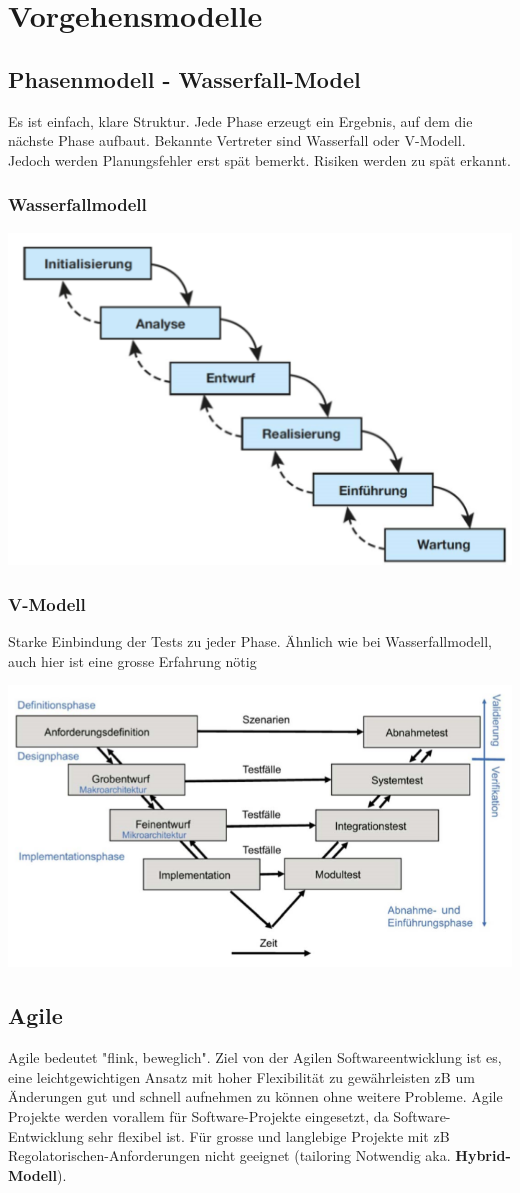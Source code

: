 \section{Vorgehensmodelle}
\subsection{Phasenmodell - Wasserfall-Model}
Es ist einfach, klare Struktur. Jede Phase erzeugt ein Ergebnis, auf dem die nächste Phase aufbaut. Bekannte Vertreter sind Wasserfall oder V-Modell. Jedoch werden Planungsfehler erst spät bemerkt. Risiken werden zu spät erkannt. 
\subsubsection{Wasserfallmodell}
\begin{center}
	\includegraphics[width=0.6\columnwidth]{Images/Wasserfallmodell}
\end{center}

\subsubsection{V-Modell}
Starke Einbindung der Tests zu jeder Phase. Ähnlich wie bei Wasserfallmodell, auch hier ist eine grosse Erfahrung nötig
\begin{center}
	\includegraphics[width=0.6\columnwidth]{Images/v-modell}
\end{center}


\subsection{Agile}
Agile bedeutet "flink, beweglich". Ziel von der Agilen Softwareentwicklung ist es, eine leichtgewichtigen Ansatz mit hoher Flexibilität zu gewährleisten zB um Änderungen gut und schnell aufnehmen zu können ohne weitere Probleme. Agile Projekte werden vorallem für Software-Projekte eingesetzt, da Software-Entwicklung sehr flexibel ist. Für grosse und langlebige Projekte mit zB Regolatorischen-Anforderungen nicht geeignet (tailoring Notwendig aka. \textbf{Hybrid-Modell}).

